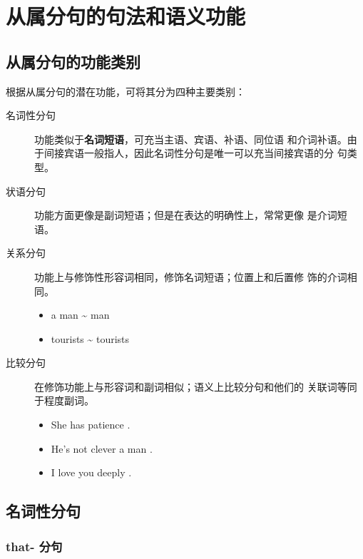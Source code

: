 \section{从属分句的句法和语义功能}

\subsection{从属分句的功能类别}

根据从属分句的潜在功能，可将其分为四种主要类别：
\begin{description}
\item[名词性分句] 功能类似于\textbf{名词短语}，可充当主语、宾语、补语、同位语
  和介词补语。由于间接宾语一般指人，因此名词性分句是唯一可以充当间接宾语的分
  句类型。

\item[状语分句] 功能方面更像是副词短语；但是在表达的明确性上，常常更像
  是介词短语。

\item[关系分句] 功能上与修饰性形容词相同，修饰名词短语；位置上和后置修
  饰的介词相同。
  \begin{itemize}
  \item a man  \~{}  man
  \item tourists  \~{} tourists 
  \end{itemize}

\item[比较分句] 在修饰功能上与形容词和副词相似；语义上比较分句和他们的
  关联词等同于程度副词。
  \begin{itemize}
  \item She has  patience .
  \item He's not  clever a man .
  \item I love you  deeply .
  \end{itemize}
\end{description}

\subsection{名词性分句}

\subsubsection{that- 分句}
\label{subsub:thatclause}

